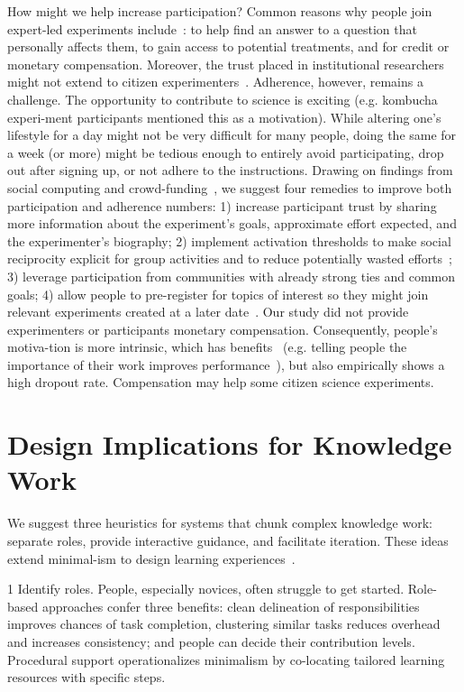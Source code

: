 How might we help increase participation? Common reasons why people join expert-led experiments include~\cite{NIH2015}: to help find an answer to a question that personally affects them, to gain access to potential treatments, and for credit or monetary compensation. Moreover, the trust placed in institutional researchers might not extend to citizen experimenters~\cite{Cooper2014}. 
Adherence, however, remains a challenge. The opportunity to contribute to science is exciting (e.g. kombucha experi-ment participants mentioned this as a motivation). While altering one’s lifestyle for a day might not be very difficult for many people, doing the same for a week (or more) might be tedious enough to entirely avoid participating, drop out after signing up, or not adhere to the instructions.
Drawing on findings from social computing and crowd-funding~\cite{hui2014understanding, Karkar2017a }, we suggest four remedies to improve both participation and adherence numbers: 1) increase participant trust by sharing more information about the experiment’s goals, approximate effort expected, and the experimenter’s biography; 2) implement activation thresholds to make social reciprocity explicit for group activities and to reduce potentially wasted efforts~\cite{cheng2014catalyst}; 3) leverage participation from communities with already strong ties and common goals; 4) allow people to pre-register for topics of interest so they might join relevant experiments created at a later date~\cite{bernstein2011crowds}.
Our study did not provide experimenters or participants monetary compensation. Consequently, people’s motiva-tion is more intrinsic, which has benefits~\cite{NationalCouncilforVoluntaryOrganisations2018} (e.g. telling people the importance of their work improves performance~\cite{Chandler2013}), but also empirically shows a high dropout rate. Compensation may help some citizen science experiments. 

\section{Design Implications for Knowledge Work}
We suggest three heuristics for systems that chunk complex knowledge work: separate roles, provide interactive guidance, and facilitate iteration. These ideas extend minimal-ism to design learning experiences~\cite{VanderMeij1995}. 

1 Identify roles. People, especially novices, often struggle to get started. Role-based approaches confer three benefits: clean delineation of responsibilities improves chances of task completion, clustering similar tasks reduces overhead and increases consistency; and people can decide their contribution levels. Procedural support operationalizes minimalism by co-locating tailored learning resources with specific steps.

